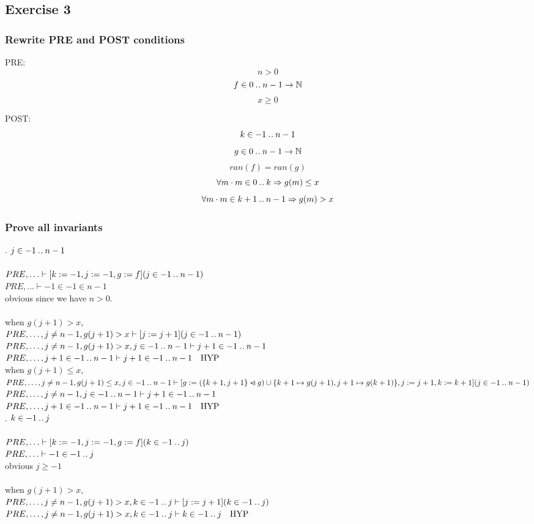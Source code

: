 \documentclass[11pt,a4paper,fleqn]{article}
\begin{document}
\subsection{Exercise 3}

\subsubsection{Rewrite PRE and POST conditions}
\noindent
PRE: \\
$$ n>0$$ $$ f \in 0 \mathbin{.\mkern1mu.} n-1 \rightarrow \mathbb{N}$$ $$ x \ge 0$$

\noindent
POST:\\
$$k \in -1 \mathbin{.\mkern1mu.} n-1 $$ $$ g \in 0 \mathbin{.\mkern1mu.} n-1 \rightarrow \mathbb{N}$$
$$ ran(f) =ran(g) $$ $$ \forall m \cdot m \in 0 \mathbin{.\mkern1mu.} k \Rightarrow g(m) \leq x $$ $$\forall m \cdot m \in k+1 \mathbin{.\mkern1mu.} n-1 \Rightarrow g(m) > x  $$

\subsubsection{Prove all invariants}
. $ j \in -1 \mathbin{.\mkern1mu.} n-1$\\
\\
$PRE,\ldots \vdash [k:=-1,j:=-1,g:=f](j\in -1 \mathbin{.\mkern1mu.} n-1) $\\
$PRE,\ldots \vdash -1 \in -1 \in n-1 $\\
obvious since we have $n>0$.\\
\\
when $g(j+1)>x$,\\
$PRE,\ldots,j \not= n-1,g(j+1)>x  \vdash [j:=j+1](j\in -1 \mathbin{.\mkern1mu.} n-1) $\\
$PRE,\ldots,j \not= n-1,g(j+1)>x,j\in -1 \mathbin{.\mkern1mu.} n-1  \vdash j+1\in -1 \mathbin{.\mkern1mu.} n-1 $\\
$PRE,\ldots,j+1\in -1 \mathbin{.\mkern1mu.} n-1 \vdash j+1\in -1 \mathbin{.\mkern1mu.} n-1 \quad \text{HYP}$\\

\noindent
when $g(j+1) \leq x$,\\
$PRE,\ldots,j \not= n-1,g(j+1) \le x,j\in -1 \mathbin{.\mkern1mu.} n-1 \vdash [g :=(\{k+1, j+1\} \mathbin{\lhd\mkern-14mu-} g) \cup\{k+1 \mapsto g(j+1), j+1 \mapsto g(k+1)\},j:=j+1,k:=k+1](j\in -1 \mathbin{.\mkern1mu.} n-1) $\\
$PRE,\ldots,j \not= n-1,j\in -1 \mathbin{.\mkern1mu.} n-1  \vdash j+1\in -1 \mathbin{.\mkern1mu.} n-1 $\\
$PRE,\ldots,j+1\in -1 \mathbin{.\mkern1mu.} n-1 \vdash j+1\in -1 \mathbin{.\mkern1mu.} n-1 \quad \text{HYP}$\\

. $k \in -1 \mathbin{.\mkern1mu.} j$\\
\\
$PRE,\ldots \vdash [k:=-1,j:=-1,g:=f](k \in -1 \mathbin{.\mkern1mu.} j) $\\
$PRE,\ldots \vdash -1 \in -1 \mathbin{.\mkern1mu.} j$\\
obvious $j \ge -1$\\
\\
when $g(j+1)>x$,\\
$PRE,\ldots,j \not= n-1,g(j+1)>x,k \in -1 \mathbin{.\mkern1mu.} j  \vdash [j:=j+1](k \in -1 \mathbin{.\mkern1mu.} j) $\\
$PRE,\ldots,j \not= n-1,g(j+1)>x,k \in -1 \mathbin{.\mkern1mu.} j  \vdash k \in -1 \mathbin{.\mkern1mu.} j \quad \text{HYP}$\\
\end{document}
